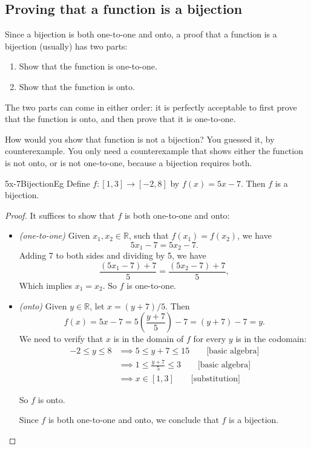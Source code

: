 \subsection{Proving that a function is a bijection}

Since a bijection  is both one-to-one and onto, a proof that a function is a bijection (usually) has two parts:
	\begin{enumerate}
	\item Show that the function is one-to-one.
	\item Show that the function is onto.
	\end{enumerate}
The two parts can come in either order: it is perfectly acceptable to first prove that the function is onto, and then prove that it is one-to-one.

How would you show that function is not a bijection?  You guessed it, by counterexample.  You only need a counterexample that shows either the function is not onto, or is not one-to-one, because a bijection requires both.

\begin{example}{5x-7BijectionEg}
Define $f \colon [1,3] \to [-2,8]$ by $f(x) = 5x-7$. Then $f$ is a bijection.

\begin{proof}
It suffices to show that $f$ is both one-to-one and onto:
\begin{itemize}
\item  \emph{(one-to-one)} Given $x_1,x_2 \in \mathbb{R}$, such that $f(x_1) = f(x_2)$, we have
$$5x_1 - 7 = 5x_2 - 7.$$
\medskip
\noindent
Adding 7 to both sides and dividing by 5, we have
$$ \frac{(5x_1-7)+7}{5} =  \frac{(5x_2-7)+7}{5},$$
\noindent
Which implies $x_1=x_2$. So $f$ is one-to-one.
\item
\emph{(onto)}  Given $y \in \mathbb{R}$, let $x = (y+7)/5$. Then
\[ f(x) = 5x-7 = 5 \left( \frac{y+7}{5} \right) - 7 = (y+7) - 7 = y.\]
We need to verify that $x$ is in the domain of $f$ for every $y$ is in the codomain:
\begin{align*}
-2 \le y \le 8  &\implies 5 \le y+7 \le 15 \qquad \text{[basic algebra]}\\
 & \implies  1 \le \frac{y+7}{5} \le 3 \qquad \text{[basic algebra]}\\
& \implies x \in [1,3] \qquad \text{[substitution]}
\end{align*}

So $f$ is onto.

Since $f$ is both one-to-one and onto, we conclude that $f$ is a bijection.
\end{itemize}
\end{proof}
\end{example} 

